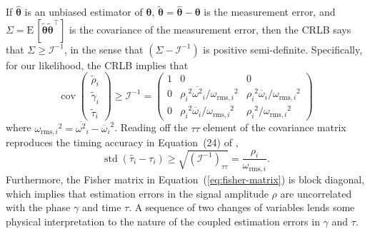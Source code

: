 \documentclass[amsmath,amssymb,aps,prx,reprint,nopreprintnumbers,nofootinbib]{revtex4-1}
\DeclareMathOperator{\cov}{cov}
\DeclareMathOperator{\std}{std}
\begin{document}
If $\hat{\bm\theta}$ is an unbiased estimator of $\bm\theta$, $\tilde{\bm\theta} = \hat{\bm\theta} - \bm\theta$ is the measurement error, and $\Sigma = \mathrm{E} \, [\tilde{\bm\theta}\tilde{\bm\theta}^\intercal]$ is the covariance of the measurement error, then the \ac{CRLB} says that $\Sigma \geq \mathcal{I}^{-1}$, in the sense that $\left(\Sigma - \mathcal{I}^{-1}\right)$ is positive semi\nobreakdashes-definite. Specifically, for our likelihood, the \ac{CRLB} implies that
%
\begin{equation}\label{eq:covariance-matrix}
    \cov{
        \left(
        \begin{array}{c}
            \tilde{\rho}_i \\
            \tilde{\gamma}_i \\
            \tilde{\tau}_i
        \end{array}
        \right)
    } \geq \mathcal{I}^{-1} = \left(
        \begin{array}{ccc}
            1 & 0 & 0 \\
            0 & {\rho_i}^2 {\overline{\omega^2}}_i/{\omega_{\mathrm{rms},i}}^2 & {\rho_i}^2 {\overline{\omega}}_i/{\omega_{\mathrm{rms},i}}^2 \\
            0 & {\rho_i}^2 {\overline{\omega}}_i/{\omega_{\mathrm{rms},i}}^2 & {\rho_i}^2/{\omega_{\mathrm{rms},i}}^2
        \end{array}
    \right)
\end{equation}
%
where ${\omega_{\mathrm{rms},i}}^2 = {\overline{\omega^2}}_i - {{\overline{\omega}}_i}^2$. Reading off the $\tau \tau$ element of the covariance matrix reproduces the timing accuracy in Equation~(24) of \cite{fairhurst:2009},
%
\begin{equation}\label{eq:timing-crlb}
    \std \left(\hat{\tau}_i - \tau_i \right) \geq \sqrt{\left(\mathcal{I}^{-1}\right)_{\tau\tau}} = \frac{\rho_i}{\omega_{\mathrm{rms},i}}.
\end{equation}
%
Furthermore, the Fisher matrix in Equation~(\ref{eq:fisher-matrix}) is block diagonal, which implies that estimation errors in the signal amplitude $\rho$ are uncorrelated with the phase $\gamma$ and time $\tau$. A sequence of two changes of variables lends some physical interpretation to the nature of the coupled estimation errors in $\gamma$ and $\tau$.
\end{document}
